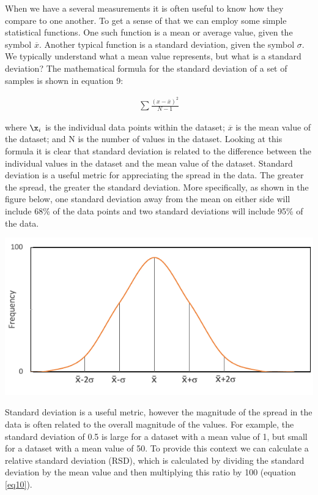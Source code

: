 \documentclass[
]{book}
\begin{document}
When we have a several measurements it is often useful to know how they compare to one another. To get a sense of that we can employ some simple statistical functions. One such function is a mean or average value, given the symbol \(\overline{x}\). Another typical function is a standard deviation, given the symbol \(\sigma\). We typically understand what a mean value represents, but what is a standard deviation? The mathematical formula for the standard deviation of a set of samples is shown in equation 9:

\[ \begin{align}
\sum \frac{\left(x-\overline{x}\right)^{2}}{N-1} \label{eq9}\tag{9} 
\end{align} \]

where \(\x_i\) is the individual data points within the dataset; \(\overline{x}\) is the mean value of the dataset; and N is the number of values in the dataset. Looking at this formula it is clear that standard deviation is related to the difference between the individual values in the dataset and the mean value of the dataset. Standard deviation is a useful metric for appreciating the spread in the data. The greater the spread, the greater the standard deviation. More specifically, as shown in the figure below, one standard deviation away from the mean on either side will include 68\% of the data points and two standard deviations will include 95\% of the data.

\includegraphics{images/StandardDeviation.png}

Standard deviation is a useful metric, however the magnitude of the spread in the data is often related to the overall magnitude of the values. For example, the standard deviation of 0.5 is large for a dataset with a mean value of 1, but small for a dataset with a mean value of 50. To provide this context we can calculate a relative standard deviation (RSD), which is calculated by dividing the standard deviation by the mean value and then multiplying this ratio by 100 (equation \ref{eq10}).
\end{document}
